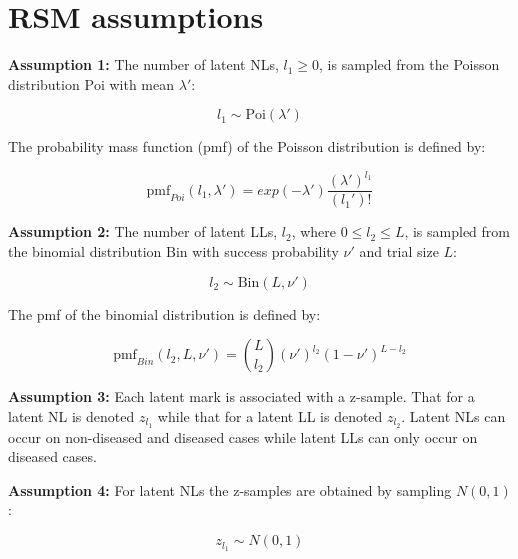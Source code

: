 \documentclass[
]{book}
\begin{document}
\hypertarget{rsm-assumptions}{%
\section{RSM assumptions}\label{rsm-assumptions}}

\textbf{Assumption 1:} The number of latent NLs, \(l_1 \geq 0\), is sampled from the Poisson distribution \(\text{Poi}\) with mean \(\lambda'\):

\begin{equation} 
l_1 \sim \text{Poi}\left ( \lambda' \right ) 
\label{eq:rsm-poisson-sampling}
\end{equation}

The probability mass function (pmf) of the Poisson distribution is defined by:

\begin{equation} 
\text{pmf}_{Poi}\left ( l_1, \lambda' \right ) = exp\left ( -\lambda' \right ) \frac{{(\lambda')^{l_1}}}{(l_1')!}
\label{eq:rsm-poisson-pmf}
\end{equation}

\textbf{Assumption 2:} The number of latent LLs, \(l_2\), where \(0 \leq l_2 \leq L\), is sampled from the binomial distribution \(\text{Bin}\) with success probability \(\nu'\) and trial size \(L\):

\begin{equation} 
l_2 \sim \text{Bin}\left ( L, \nu' \right ) 
\label{eq:rsm-binomial-sampling}
\end{equation}

The pmf of the binomial distribution is defined by:

\begin{equation} 
\text{pmf}_{Bin}\left ( l_2, L, \nu' \right ) = \binom{L}{l_2} \left (\nu'  \right )^{l_2} \left (1-\nu'  \right )^{L-l_2}
\label{eq:rsm-binomial-pmf}
\end{equation}

\textbf{Assumption 3:} Each latent mark is associated with a z-sample. That for a latent NL is denoted \(z_{l_1}\) while that for a latent LL is denoted \(z_{l_2}\). Latent NLs can occur on non-diseased and diseased cases while latent LLs can only occur on diseased cases.

\textbf{Assumption 4:} For latent NLs the z-samples are obtained by sampling \(N \left ( 0, 1 \right )\):

\begin{equation} 
z_{l_1} \sim N \left ( 0, 1 \right )
\label{eq:rsm-sampling-l1}
\end{equation}
\end{document}
